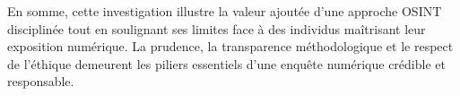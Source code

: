 \documentclass[a4paper,12pt]{report}
\begin{document}
\bigskip
\noindent
En somme, cette investigation illustre la valeur ajoutée d’une approche OSINT disciplinée tout en soulignant ses limites face à des individus maîtrisant leur exposition numérique.  
La prudence, la transparence méthodologique et le respect de l’éthique demeurent les piliers essentiels d’une enquête numérique crédible et responsable.


\end{document}
